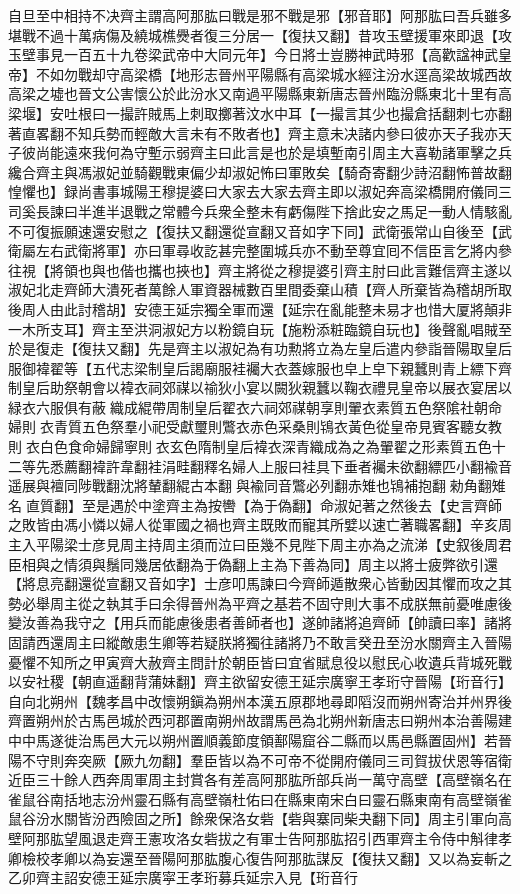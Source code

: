 自旦至中相持不决齊主謂高阿那肱曰戰是邪不戰是邪【邪音耶】阿那肱曰吾兵雖多堪戰不過十萬病傷及繞城樵㸑者復三分居一【復扶又翻】昔攻玉壁援軍來即退【攻玉壁事見一百五十九卷梁武帝中大同元年】今日將士豈勝神武時邪【高歡諡神武皇帝】不如勿戰却守高梁橋【地形志晉州平陽縣有高梁城水經注汾水逕高梁故城西故高梁之墟也晉文公害懷公於此汾水又南過平陽縣東新唐志晉州臨汾縣東北十里有高梁堰】安吐根曰一撮許賊馬上刺取擲著汶水中耳【一撮言其少也撮倉括翻刺七亦翻著直畧翻不知兵勢而輕敵大言未有不敗者也】齊主意未决諸内參曰彼亦天子我亦天子彼尚能遠來我何為守塹示弱齊主曰此言是也於是填塹南引周主大喜勒諸軍擊之兵纔合齊主與馮淑妃並騎觀戰東偏少却淑妃怖曰軍敗矣【騎奇寄翻少詩沼翻怖普故翻惶懼也】録尚書事城陽王穆提婆曰大家去大家去齊主即以淑妃奔高梁橋開府儀同三司奚長諫曰半進半退戰之常體今兵衆全整未有虧傷陛下捨此安之馬足一動人情駭亂不可復振願速還安慰之【復扶又翻還從宣翻又音如字下同】武衛張常山自後至【武衛屬左右武衛將軍】亦曰軍尋收訖甚完整圍城兵亦不動至尊宜囘不信臣言乞將内參往視【將領也與也偕也攜也挾也】齊主將從之穆提婆引齊主肘曰此言難信齊主遂以淑妃北走齊師大潰死者萬餘人軍資器械數百里間委棄山積【齊人所棄皆為稽胡所取後周人由此討稽胡】安德王延宗獨全軍而還【延宗在亂能整未易才也惜大厦將顛非一木所支耳】齊主至洪洞淑妃方以粉鏡自玩【施粉添粧臨鏡自玩也】後聲亂唱賊至於是復走【復扶又翻】先是齊主以淑妃為有功勲將立為左皇后遣内參詣晉陽取皇后服御褘翟等【五代志梁制皇后謁廟服袿䙱大衣蓋嫁服也皁上皁下親蠶則青上縹下齊制皇后助祭朝會以褘衣祠郊禖以䄖狄小宴以闕狄親蠶以鞠衣禮見皇帝以展衣宴居以緑衣六服俱有蔽織成緄帶周制皇后翟衣六祠郊禖朝享則翬衣素質五色祭隂社朝命婦則衣青質五色祭羣小祀受獻璽則鷩衣赤色采桑則鴇衣黃色從皇帝見賓客聽女教則衣白色食命婦歸寧則衣玄色隋制皇后褘衣深青織成為之為翬翟之形素質五色十二等先悉薦翻褘許韋翻袿涓畦翻釋名婦人上服曰袿具下垂者䙱未欲翻縹匹小翻褕音遥展與襢同陟戰翻沈將輦翻緄古本翻與褕同音鷩必列翻赤雉也鴇補抱翻勑角翻雉名直質翻】至是遇於中塗齊主為按轡【為于偽翻】命淑妃著之然後去【史言齊師之敗皆由馮小憐以婦人從軍國之禍也齊主既敗而寵其所嬖以速亡著職畧翻】辛亥周主入平陽梁士彦見周主持周主須而泣曰臣幾不見陛下周主亦為之流涕【史叙後周君臣相與之情須與鬚同幾居依翻為于偽翻上主為下善為同】周主以將士疲弊欲引還【將息亮翻還從宣翻又音如字】士彦叩馬諫曰今齊師遁散衆心皆動因其懼而攻之其勢必舉周主從之執其手曰余得晉州為平齊之基若不固守則大事不成朕無前憂唯慮後變汝善為我守之【用兵而能慮後患者善師者也】遂帥諸將追齊師【帥讀曰率】諸將固請西還周主曰縱敵患生卿等若疑朕將獨往諸將乃不敢言癸丑至汾水關齊主入晉陽憂懼不知所之甲寅齊大赦齊主問計於朝臣皆曰宜省賦息役以慰民心收遺兵背城死戰以安社稷【朝直遥翻背蒲妹翻】齊主欲留安德王延宗廣寧王孝珩守晉陽【珩音行】自向北朔州【魏孝昌中改懷朔鎭為朔州本漢五原郡地尋即䧟沒而朔州寄治并州界後齊置朔州於古馬邑城於西河郡置南朔州故謂馬邑為北朔州新唐志曰朔州本治善陽建中中馬遂徙治馬邑大元以朔州置順義節度領鄯陽窟谷二縣而以馬邑縣置固州】若晉陽不守則奔突厥【厥九勿翻】羣臣皆以為不可帝不從開府儀同三司賀拔伏恩等宿衛近臣三十餘人西奔周軍周主封賞各有差高阿那肱所部兵尚一萬守高壁【高壁嶺名在雀鼠谷南括地志汾州靈石縣有高壁嶺杜佑曰在縣東南宋白曰靈石縣東南有高壁嶺雀鼠谷汾水關皆汾西險固之所】餘衆保洛女砦【砦與寨同柴夬翻下同】周主引軍向高壁阿那肱望風退走齊王憲攻洛女砦拔之有軍士告阿那肱招引西軍齊主令侍中斛律孝卿檢校孝卿以為妄還至晉陽阿那肱腹心復告阿那肱謀反【復扶又翻】又以為妄斬之乙卯齊主詔安德王延宗廣寜王孝珩募兵延宗入見【珩音行